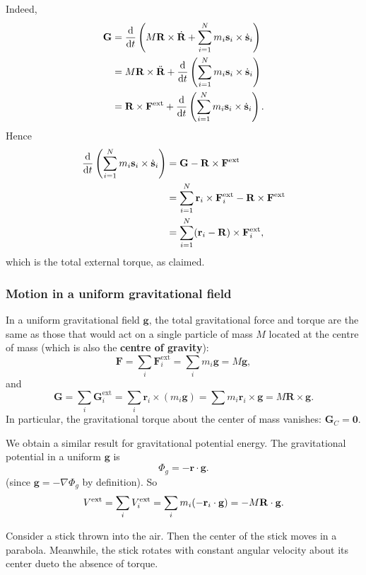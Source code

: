 Indeed, 
\begin{align*}
  {\bf G}&=\frac{\mathrm{d}}{\mathrm{d}t}\left( M{\bf R}\times\dot{{\bf R}}+\sum_{i=1}^{N}m_i{\bf s}_i\times \dot{{\bf s}}_i \right)\\ 
  &= M{\bf R} \times \ddot{{\bf R}} + \frac{\mathrm{d}}{\mathrm{d}t}\left( \sum_{i=1}^{N}m_i{\bf s}_i\times \dot{{\bf s}}_i \right)\\ 
  &= {\bf R} \times {\bf F}^{\text{ext}} +\frac{\mathrm{d}}{\mathrm{d}t}\left( \sum_{i=1}^{N}m_i{\bf s}_i\times \dot{{\bf s}}_i \right). 
\end{align*}
Hence 
\begin{align*}
  \frac{\mathrm{d}}{\mathrm{d}t}\left( \sum_{i=1}^{N}m_i{\bf s}_i\times \dot{{\bf s}}_i \right)&= {\bf G}-{\bf R} \times {\bf F}^{\text{ext}}\\ 
  &= \sum_{i=1}^{N}{\bf r}_i \times {\bf F}_i^{\text{ext}} - {\bf R} \times {\bf F}^{\text{ext}}\\ 
  &= \sum_{i=1}^{N}({\bf r}_i-{\bf R})\times {\bf F}_i^{\text{ext}},
\end{align*}
which is the total external torque, as claimed.

\subsubsection*{Motion in a uniform gravitational field}

In a uniform gravitational field $\mathbf{g}$, the total gravitational force and torque are the same as those that would act on a single particle of mass $M$ located at the centre of mass (which is also the \textbf{centre of gravity}):
\[
  \mathbf{F} = \sum_i \mathbf{F}_i^{\mathrm{ext}} = \sum_i m_i \mathbf{g} = M\mathbf{g},
\]
and 
\[
  \mathbf{G} = \sum_i \mathbf{G}_i^{\mathrm{ext}} = \sum_i \mathbf{r}_i \times (m_i \mathbf{g}) = \sum m_i \mathbf{r}_i \times \mathbf{g} = M\mathbf{R}\times \mathbf{g}.
\]
In particular, the gravitational torque about the center of mass vanishes: $\mathbf{G}_C = \mathbf{0}$.

We obtain a similar result for gravitational potential energy. The gravitational potential in a uniform $\mathbf{g}$ is
\[
  \Phi_g = -\mathbf{r}\cdot \mathbf{g}.
\]
(since $\mathbf{g} = -\nabla \Phi_g$ by definition). So
\[
  V^{\mathrm{ext}} = \sum_i V_i^{\mathrm{ext}}
  = \sum_i m_i (- \mathbf{r}_i \cdot \mathbf{g})
  = -M{\bf R}\cdot{\bf g} .
\]

\begin{example}
  Consider a stick thrown into the air. Then the center of the stick moves in a parabola. Meanwhile, the stick rotates with constant angular velocity about its center dueto the absence of torque.
\end{example}

